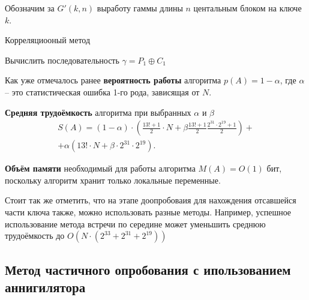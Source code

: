 \documentclass[a4paper,12pt]{article}
\theoremstyle{definition}
\begin{document}
	Обозначим за $G'(k, n)$ выработу гаммы длины $n$ центальным блоком на ключе $k$.
	
	\begin{algorithm}[H]
		
		\caption{Корреляциооный метод}
		\label{alg:Corr}
		\SetAlgoNoEnd
		
		
		Вычислить последовательность $\gamma = P_1 \oplus C_1$
		
	\end{algorithm}	
	
	Как уже отмечалось ранее \textbf{вероятность работы} алгоритма $p(A)=1-\alpha$, где $\alpha$ -- это статистическая ошибка 1-го рода, зависящая от $N$. 
	
	\textbf{Средняя трудоёмкость} алгоритма при выбранных $\alpha$ и $\beta$ 
	\begin{multline*}	
	S(A)=\left( 1-\alpha \right)\cdot \left( \frac{13! + 1}{2} \cdot N + \beta \frac{13! + 1}{2} \frac{2^{31} \cdot 2^{19} + 1}{2} \right) + \\ + \alpha \left( 13! \cdot N + \beta \cdot 2^{31} \cdot 2^{19}  \right).
	\end{multline*}		

	\textbf{Объём памяти} необходимый для работы алгоритма $M(A) = O(1)$ бит, поскольку алгоритм хранит только локальные переменные.
	
	Стоит так же отметить, что на этапе доопробоваия для нахождения отсавшейся части ключа также, можно использовать разные методы. Например, успешное использование метода встречи по середине может уменьшить среднюю трудоёмкость до $O\left(N\cdot\left( 2^{33} + 2^{31} + 2^{19} \right) \right)$
	
	\subsection{Метод частичного опробования с ипользованием аннигилятора}
	
\end{document}
